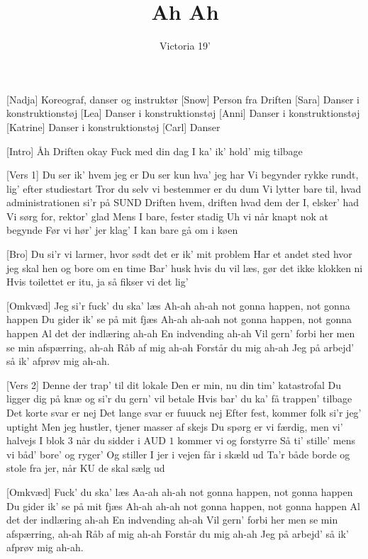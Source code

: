 \documentclass[a4paper,11pt]{article}
\title{Ah Ah}
\author{Victoria 19'}
\begin{document}
\maketitle

\begin{roles}
[Nadja] Koreograf, danser og instruktør
[Snow] Person fra Driften
[Sara] Danser i konstruktionstøj
[Lea] Danser i konstruktionstøj
[Anni] Danser i konstruktionstøj
[Katrine] Danser i konstruktionstøj
[Carl] Danser
\end{roles}

\begin{song}
[Intro] Åh Driften okay
Fuck med din dag
I ka' ik' hold' mig tilbage

[Vers 1] Du ser ik' hvem jeg er
Du ser kun hva' jeg har
Vi begynder rykke rundt, lig' efter studiestart 
Tror du selv vi bestemmer er du dum 
Vi lytter bare til, hvad administrationen si'r på SUND
Driften hvem, driften hvad
dem der I, elsker' had
Vi sørg for, rektor' glad
Mens I bare, fester stadig
Uh vi når knapt nok at begynde
Før vi hør' jer klag' I kan bare gå om i køen

[Bro] Du si'r vi larmer, hvor sødt det er ik' mit problem
Har et andet sted hvor jeg skal hen og bore om en time
Bar' husk hvis du vil læs, gør det ikke klokken ni
Hvis toilettet er itu, ja så fikser vi det lig'

[Omkvæd] Jeg si'r fuck' du ska' læs
Ah-ah ah-ah not gonna happen, not gonna happen
Du gider ik' se på mit fjæs
Ah-ah ah-aah not gonna happen, not gonna happen
Al det der indlæring ah-ah 
En indvending ah-ah
Vil gern' forbi her men se min afspærring, ah-ah
Råb af mig ah-ah
Forstår du mig ah-ah
Jeg på arbejd' så ik' afprøv mig ah-ah. 

[Vers 2] Denne der trap' til dit lokale 
Den er min, nu din tim' katastrofal 
Du ligger dig på knæ og si'r du gern' vil betale
Hvis bar' du ka' få trappen' tilbage
Det korte svar er nej
Det lange svar er fuuuck nej
Efter fest, kommer folk si'r jeg' uptight
Men jeg hustler, tjener masser af skejs
Du spørg er vi færdig, men vi' halvejs 
I blok $3$ når du sidder i AUD $1$ kommer vi og forstyrre
Så ti' stille' mens vi båd' bore' og ryger' 
Og stiller I jer i vejen får i skæld ud
Ta'r både borde og stole fra jer, når KU de skal sælg ud 

[Omkvæd] Fuck' du ska' læs
Aa-ah ah-ah not gonna happen, not gonna happen
Du gider ik' se på mit fjæs
Ah-ah ah-ah not gonna happen, not gonna happen
Al det der indlæring ah-ah 
En indvending ah-ah
Vil gern' forbi her men se min afspærring, ah-ah
Råb af mig ah-ah
Forstår du mig ah-ah
Jeg på arbejd' så ik' afprøv mig ah-ah.
\end{song}
\end{document}
